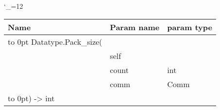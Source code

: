 \begingroup \catcode`\_=12 \tt
\begin{tabular}{lll}
\toprule
\textrm{Name}&\textrm{Param name}&\textrm{param type}\\
\midrule
\hbox to 0pt {Datatype.Pack_size(\hss}\\
& self\\
& count & int\\
& comm & Comm\\
\hbox to 0pt{) -> int\hss}\\
\bottomrule
\end{tabular}
\endgroup
